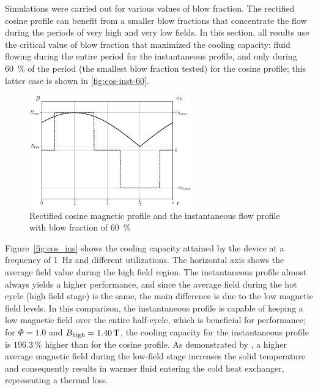 \documentclass[referee]{svjour3}
\begin{document}
Simulations were carried out for various values of blow fraction. The rectified cosine profile can benefit from a smaller blow fractions that concentrate the flow during the periods of very high and very low fields. In this section, all results use the critical value of blow fraction that maximized the cooling capacity: fluid flowing during the entire period for the instantaneous profile, and only during \SI{60}{\percent} of the period (the smallest blow fraction tested) for the cosine profile; this latter case is shown in \autoref{fig:cos-inst-60}.

\begin{figure}[!ht]
  \centering
  \includegraphics[width=7cm]{Fig6-profiles_rc_and_flow_instantaneous}
  \caption{Rectified cosine magnetic profile and the instantaneous flow profile with blow fraction of \SI{60}{\percent}}
  \label{fig:cos-inst-60}
\end{figure}

Figure~\ref{fig:cos_ins} shows the cooling capacity attained by the device at a frequency of \SI{1}{\hertz} and different utilizations. The horizontal axis shows the average field value during the high field region. The instantaneous profile almost always yields a higher performance, and since the average field during the hot cycle (high field stage) is the same, the main difference is due to the low magnetic field levels. In this comparison, the instantaneous profile is capable of keeping a low magnetic field over the entire half-cycle, which is beneficial for performance;  for $\Phi=1.0$ and $B_{\mathrm{high}} = \SI{1.40}{\tesla}$, the cooling capacity for the instantaneous profile is $\SI{196.3}{\percent}$ higher than for the cosine profile.  As demonstrated by \cite{bib:asme-mce}, a higher average magnetic field during the low-field stage increases the solid temperature and consequently results in  warmer fluid entering the cold heat exchanger, representing a thermal loss. 
\end{document}

